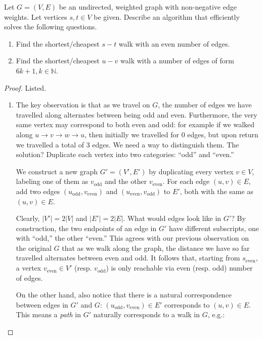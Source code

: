   \begin{exercise}
    Let $G=(V,E)$ be an undirected, weighted graph with non-negative edge weights. Let vertices $s,t\in V$ be given. Describe an algorithm that efficiently solves the following questions.
    \begin{enumerate}
      \item Find the shortest/cheapest $s-t$ walk with an even number of edges.
      \item Find the shortest/cheapest $u-v$ walk with a number of edges of form $6k+1, k\in \mathbb{N}$. 
    \end{enumerate}
  \end{exercise}
  \begin{proof}
    Listed. 
    \begin{enumerate}
      \item The key observation is that as we travel on $G$, the number of edges we have travelled along alternates between being odd and even. Furthermore, the very same vertex may correspond to both even and odd: for example if we walked along $u\to v\to w\to u$, then initially we travelled for $0$ edges, but upon return we travelled a total of $3$ edges. We need a way to distinguish them. The solution? Duplicate each vertex into two categories: ``odd'' and ``even.''

      We construct a new graph $G' = (V', E')$ by duplicating every vertex $v\in V$, labeling one of them as $v_{\text{odd}}$ and the other $v_{\text{even}}$. For each edge $(u,v)\in E$, add two edges $(u_{\text{odd}}, v_\text{even})$ and $(u_{\text{even}}, v_{\text{odd}})$ to $E'$, both with the same as $(u,v)\in E$. 

      Clearly, $\lvert V'\rvert  = 2 \lvert V\rvert $ and $\lvert E'\rvert  = 2 \lvert E\rvert $. What would edges look like in $G'$? By construction, the two endpoints of an edge in $G'$ have different subscripts, one with ``odd,'' the other ``even.'' This agrees with our previous observation on the original $G$ that as we walk along the graph, the distance we have so far travelled alternates between even and odd. It follows that, starting from $s_\text{even}$, a vertex $v_\text{even}\in V'$ (resp. $v_\text{odd}$) is only reachable via even (resp. odd) number of edges. 

      On the other hand, also notice that there is a natural correspondence between edges in $G'$ and $G$: $(u_\text{odd}, v_\text{even})\in E'$ corresponds to $(u,v)\in E$. This means a \textit{path} in $G'$ naturally corresponds to a walk in $G$, e.g.:


\end{enumerate}
\end{proof}

